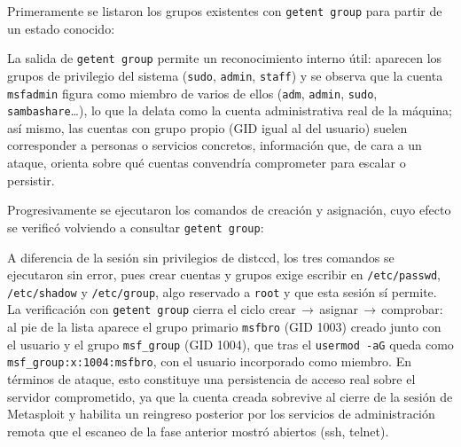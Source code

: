 Primeramente se listaron los grupos existentes con \texttt{getent group} para partir de un estado conocido:


\begin{analisis}
La salida de \texttt{getent group} permite un reconocimiento interno útil: aparecen los grupos de privilegio del sistema (\texttt{sudo}, \texttt{admin}, \texttt{staff}) y se observa que la cuenta \texttt{msfadmin} figura como miembro de varios de ellos (\texttt{adm}, \texttt{admin}, \texttt{sudo}, \texttt{sambashare}\dots), lo que la delata como la cuenta administrativa real de la máquina; así mismo, las cuentas con grupo propio (GID igual al del usuario) suelen corresponder a personas o servicios concretos, información que, de cara a un ataque, orienta sobre qué cuentas convendría comprometer para escalar o persistir.
\end{analisis}

Progresivamente se ejecutaron los comandos de creación y asignación, cuyo efecto se verificó volviendo a consultar \texttt{getent group}:




\begin{analisis}
A diferencia de la sesión sin privilegios de distccd, los tres comandos se ejecutaron sin error, pues crear cuentas y grupos exige escribir en \texttt{/etc/passwd}, \texttt{/etc/shadow} y \texttt{/etc/group}, algo reservado a \texttt{root} y que esta sesión sí permite. La verificación con \texttt{getent group} cierra el ciclo crear\,$\rightarrow$\,asignar\,$\rightarrow$\,comprobar: al pie de la lista aparece el grupo primario \texttt{msfbro} (GID 1003) creado junto con el usuario y el grupo \texttt{msf\_group} (GID 1004), que tras el \texttt{usermod -aG} queda como \texttt{msf\_group:x:1004:msfbro}, con el usuario incorporado como miembro. En términos de ataque, esto constituye una persistencia de acceso real sobre el servidor comprometido, ya que la cuenta creada sobrevive al cierre de la sesión de Metasploit y habilita un reingreso posterior por los servicios de administración remota que el escaneo de la fase anterior mostró abiertos (ssh, telnet).
\end{analisis}

